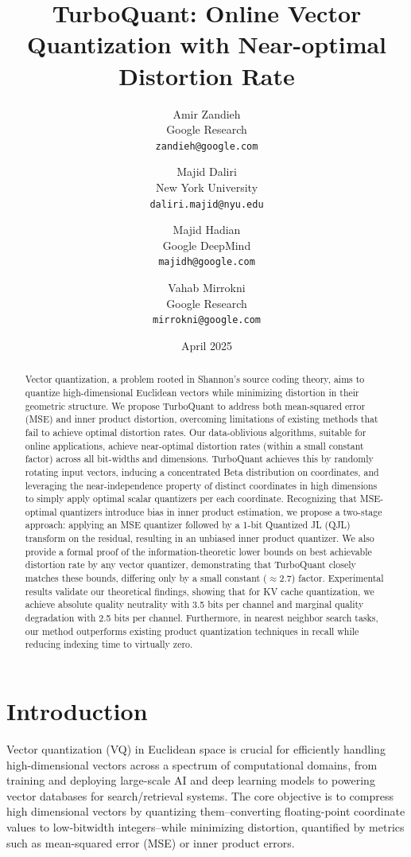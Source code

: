 \documentclass[11pt]{article}
\title{TurboQuant: Online Vector Quantization with Near-optimal Distortion Rate}
\author{
Amir Zandieh \\
Google Research \\
\texttt{zandieh@google.com}
\and
Majid Daliri \\
New York University \\
\texttt{daliri.majid@nyu.edu}
\and
Majid Hadian \\
Google DeepMind \\
\texttt{majidh@google.com}
\and
Vahab Mirrokni \\
Google Research \\
\texttt{mirrokni@google.com}
}
\date{April 2025}
\begin{document}
\maketitle

\begin{abstract}
Vector quantization, a problem rooted in Shannon's source coding theory, aims to quantize high-dimensional Euclidean vectors while minimizing distortion in their geometric structure. We propose TurboQuant to address both mean-squared error (MSE) and inner product distortion, overcoming limitations of existing methods that fail to achieve optimal distortion rates. Our data-oblivious algorithms, suitable for online applications, achieve near-optimal distortion rates (within a small constant factor) across all bit-widths and dimensions. TurboQuant achieves this by randomly rotating input vectors, inducing a concentrated Beta distribution on coordinates, and leveraging the near-independence property of distinct coordinates in high dimensions to simply apply optimal scalar quantizers per each coordinate. Recognizing that MSE-optimal quantizers introduce bias in inner product estimation, we propose a two-stage approach: applying an MSE quantizer followed by a 1-bit Quantized JL (QJL) transform on the residual, resulting in an unbiased inner product quantizer. We also provide a formal proof of the information-theoretic lower bounds on best achievable distortion rate by any vector quantizer, demonstrating that TurboQuant closely matches these bounds, differing only by a small constant ($\approx 2.7$) factor. Experimental results validate our theoretical findings, showing that for KV cache quantization, we achieve absolute quality neutrality with 3.5 bits per channel and marginal quality degradation with 2.5 bits per channel. Furthermore, in nearest neighbor search tasks, our method outperforms existing product quantization techniques in recall while reducing indexing time to virtually zero.
\end{abstract}

\section{Introduction}

Vector quantization (VQ) in Euclidean space is crucial for efficiently handling high-dimensional vectors across a spectrum of computational domains, from training and deploying large-scale AI and deep learning models to powering vector databases for search/retrieval systems. The core objective is to compress high dimensional vectors by quantizing them--converting floating-point coordinate values to low-bitwidth integers--while minimizing distortion, quantified by metrics such as mean-squared error (MSE) or inner product errors.
\end{document}
